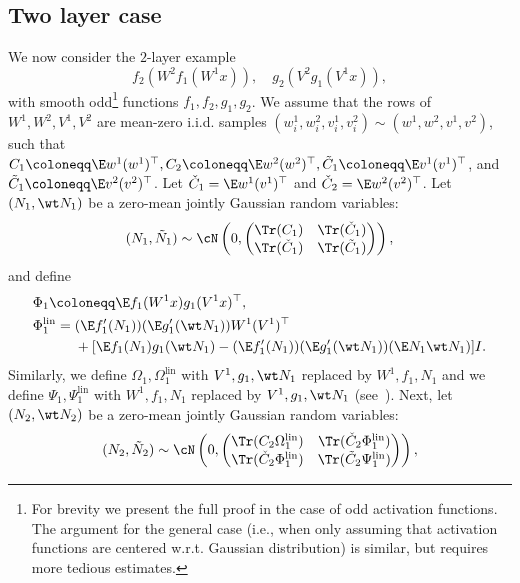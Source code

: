 \subsection{Two layer case}
\label{app:second_layer}
We now consider the  $2$-layer example
\begin{equation}
    f_2(W^2 f_1(W^1 x)), \quad g_2(V^2 g_1(V^1 x)),
\end{equation}
with smooth odd\footnote{For brevity we present the full proof in the case of odd activation functions. The argument for the general case (i.e., when only assuming that activation functions are centered w.r.t. Gaussian distribution) is similar, but requires more tedious estimates.} functions $f_1,f_2,g_1, g_2$. We assume that the rows of \(W^1, W^2, V^1, V^2\) are mean-zero i.i.d. samples \((w^1_i, w^2_i, v^1_i, v^2_i) \sim (w^1, w^2, v^1, v^2)\), such that \(C_1 \coloneqq \E w^1(w^1)^{\top}, C_2 \coloneqq \E w^2(w^2)^{\top}, \tilde C_1 \coloneqq \E v^1(v^1)^{\top}\), and \(\tilde C_1 \coloneqq \E v^2(v^2)^{\top}\). Let \(\check C_1 = \E w^1 (v^1)^{\top}\) and \(\check C_2 =\E w^2 (v^2)^{\top}\). Let \((N_1, \wt N_1)\) be a zero-mean jointly Gaussian random variables:
\begin{equation}
    (N_1, \tilde N_1) \sim \cN \left(0,  \begin{pmatrix} \Tr(C_1) & \Tr(\check C_1)\\ \Tr(\check C_1) & \Tr(\tilde C_1) \end{pmatrix} \right),
\end{equation}
and define
\begin{equation}
\begin{aligned}
    &\Phi_1 \coloneqq \E f_1(W^1 x) g_1(V^1x)^\top, \\
    &\Phi_1^{\mathrm{lin}} = (\E f_1'(N_1))(\E g_1'(\wt N_1)) W^1 (V^1)^\top \\
    &\qquad \quad + [\E f_1(N_1)g_1(\wt N_1)-(\E f_1'(N_1))(\E g_1'(\wt N_1))(\E N_1 \wt N_1)] I. \\
\end{aligned}
\end{equation}
Similarly, we define \(\Omega_1, \Omega_1^{\mathrm{lin}}\) with \(V^1, g_1, \wt N_1\) replaced by \(W^1, f_1, N_1\) and we define \(\Psi_1, \Psi_1^{\mathrm{lin}}\) with \(W^1, f_1,  N_1\) replaced by \(V^1, g_1, \wt N_1\) (see~).
Next, let \((N_2, \wt N_2)\) be a zero-mean jointly Gaussian random variables:
\begin{equation}
    (N_2, \tilde N_2) \sim \cN \left(0,  \begin{pmatrix} \Tr(C_2 \Omega_1^{\mathrm{lin}}) & \Tr (\check C_2 \Phi_1^{\mathrm{lin}})\\ \Tr (\check C_2 \Phi_1^{\mathrm{lin}}) & \Tr(\tilde C_2 \Psi_1^{\mathrm{lin}}) \end{pmatrix} \right),
\end{equation}

